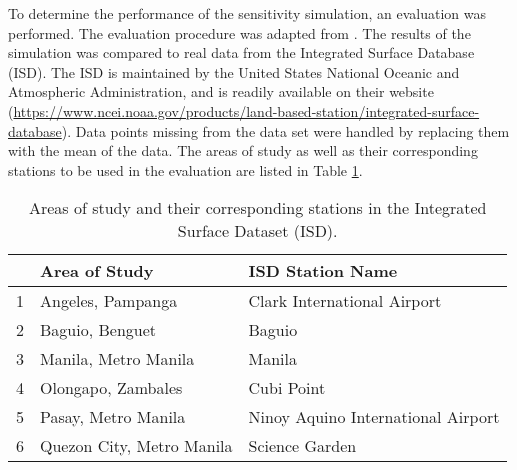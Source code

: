 	To determine the performance of the sensitivity simulation, an evaluation was performed. The evaluation procedure was adapted from \textcite{Bilang2022}.
	The results of the simulation was compared to real data from the Integrated Surface Database (ISD).
	The ISD is maintained by the United States National Oceanic and Atmospheric Administration, and is readily available on their website 
		(\url{https://www.ncei.noaa.gov/products/land-based-station/integrated-surface-database}).
	Data points missing from the data set were handled by replacing them with the mean of the data.
	The areas of study as well as their corresponding stations to be used in the evaluation are listed in Table \ref{tab:isd-stations}.

	\begin{table}	
		\caption{Areas of study and their corresponding stations in the Integrated Surface Dataset (ISD).}
		\label{tab:isd-stations}
		\centering
		\begin{tabular}{lll}
			\hline \hline
			& Area of Study             & ISD Station Name                       \\
			\hline
			1 & Angeles, Pampanga         & Clark International Airport        \\
			2 & Baguio, Benguet           & Baguio                             \\
			3 & Manila, Metro Manila      & Manila                             \\
			4 & Olongapo, Zambales        & Cubi Point                         \\
			5 & Pasay, Metro Manila      & Ninoy Aquino International Airport \\
			6 & Quezon City, Metro Manila & Science Garden \\                   
			\hline
		\end{tabular}	
	\end{table}

